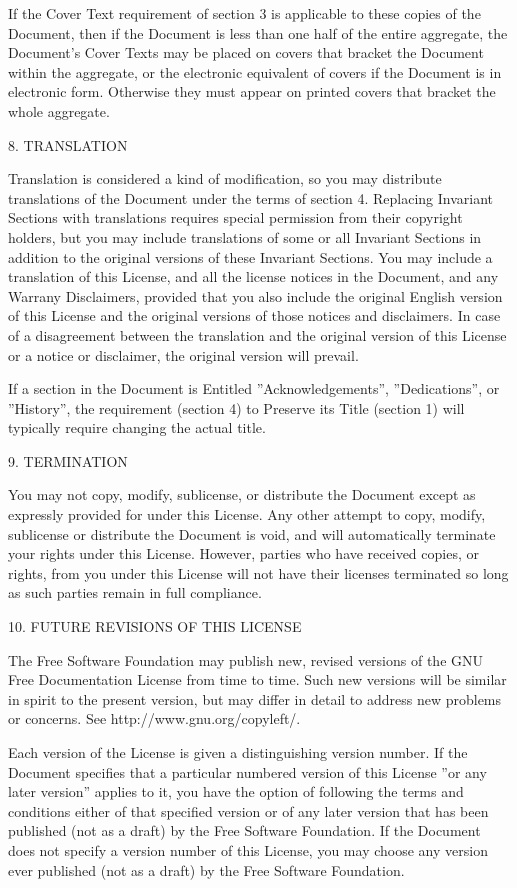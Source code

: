 If the Cover Text requirement of section 3 is applicable to these copies of the Document, then if the Document is less
than one half of the entire aggregate, the Document's Cover Texts may be placed on covers that bracket the Document
within the aggregate, or the electronic equivalent of covers if the Document is in electronic form. Otherwise they must
appear on printed covers that bracket the whole aggregate.

8. TRANSLATION

Translation is considered a kind of modification, so you may distribute translations of the Document under the terms of
section 4. Replacing Invariant Sections with translations requires special permission from their copyright holders, but
you may include translations of some or all Invariant Sections in addition to the original versions of these Invariant
Sections. You may include a translation of this License, and all the license notices in the Document, and any Warrany
Disclaimers, provided that you also include the original English version of this License and the original versions of
those notices and disclaimers. In case of a disagreement between the translation and the original version of this
License or a notice or disclaimer, the original version will prevail.

If a section in the Document is Entitled ''Acknowledgements'', ''Dedications'', or ''History'', the requirement
(section 4) to Preserve its Title (section 1) will typically require changing the actual title.

9. TERMINATION

You may not copy, modify, sublicense, or distribute the Document except as expressly provided for under this License.
Any other attempt to copy, modify, sublicense or distribute the Document is void, and will automatically terminate your
rights under this License. However, parties who have received copies, or rights, from you under this License will not
have their licenses terminated so long as such parties remain in full compliance.

10. FUTURE REVISIONS OF THIS LICENSE

The Free Software Foundation may publish new, revised versions of the GNU Free Documentation License from time to time.
Such new versions will be similar in spirit to the present version, but may differ in detail to address new problems or
concerns. See http://www.gnu.org/copyleft/.

Each version of the License is given a distinguishing version number. If the Document specifies that a particular
numbered version of this License ''or any later version'' applies to it, you have the option of following the terms and
conditions either of that specified version or of any later version that has been published (not as a draft) by the
Free Software Foundation. If the Document does not specify a version number of this License, you may choose any version
ever published (not as a draft) by the Free Software Foundation.

\clearpage
